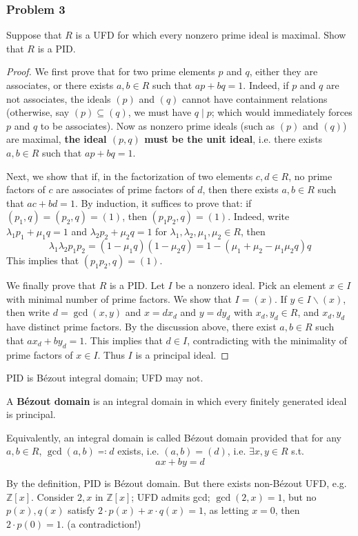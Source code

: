 \subsubsection{Problem 3}

\begin{exercise}
Suppose that $R$ is a UFD for which every nonzero prime ideal is maximal. Show that $R$ is a PID.
\end{exercise}
\begin{proof}
We first prove that for two prime elements $p$ and $q$, either they are associates, or there exists $a, b \in R$ such that $a p+b q=1$. Indeed, if $p$ and $q$ are not associates, the ideals $(p)$ and $(q)$ cannot have containment relations (otherwise, say $(p) \subseteq(q)$, we must have $q \mid p$; which would immediately forces $p$ and $q$ to be associates). Now as nonzero prime ideals (such as $(p)$ and $(q)$) are maximal, \textbf{the ideal $(p, q)$ must be the unit ideal}, i.e. there exists $a, b \in R$ such that $a p+b q=1$.

Next, we show that if, in the factorization of two elements $c, d \in R$, no prime factors of $c$ are associates of prime factors of $d$, then there exists $a, b \in R$ such that $a c+b d=1$. By induction, it suffices to prove that: if $\left(p_1, q\right)=\left(p_2, q\right)=(1)$, then $\left(p_1 p_2, q\right)=(1)$. Indeed, write $\lambda_1 p_1+\mu_1 q=1$ and $\lambda_2 p_2+\mu_2 q=1$ for $\lambda_1, \lambda_2, \mu_1, \mu_2 \in R$, then
\[
\lambda_1 \lambda_2 p_1 p_2=\left(1-\mu_1 q\right)\left(1-\mu_2 q\right)=1-\left(\mu_1+\mu_2-\mu_1 \mu_2 q\right) q
\]
This implies that $\left(p_1 p_2, q\right)=(1)$.

We finally prove that $R$ is a PID. Let $I$ be a nonzero ideal. Pick an element $x \in I$ with minimal number of prime factors. We show that $I=(x)$. If $y \in I \backslash(x)$, then write $d=\operatorname{gcd}(x, y)$ and $x=d x_d$ and $y=d y_d$ with $x_d, y_d \in R$, and $x_d, y_d$ have distinct prime factors. By the discussion above, there exist $a, b \in R$ such that $a x_d+b y_d=1$. This implies that $d \in I$, contradicting with the minimality of prime factors of $x \in I$. Thus $I$ is a principal ideal.

\end{proof}


\begin{proposition}
PID is Bézout integral domain; UFD may not.
\end{proposition}
\begin{definition}
A \textbf{Bézout domain} is an integral domain in which every finitely generated ideal is principal.
\end{definition}
\begin{note}
Equivalently, an integral domain is called Bézout domain provided that for any $a, b\in R$, $\gcd(a,b)\eqqcolon d$ exists, i.e. $(a, b)=(d)$, i.e. $\exists x, y\in R$ s.t.
\[
ax+by=d
\]
\end{note}
By the definition, PID is Bézout domain. But there exists non-Bézout UFD, e.g. $\mathbb{Z}[x]$. Consider $2,x$ in $\mathbb{Z}[x]$; UFD admits gcd; $\gcd(2,x)=1$, but no $p(x),q(x)$ satisfy $2\cdot p(x)+x\cdot q(x)=1$, as letting $x=0$, then $2\cdot p(0)=1$. (a contradiction!)
